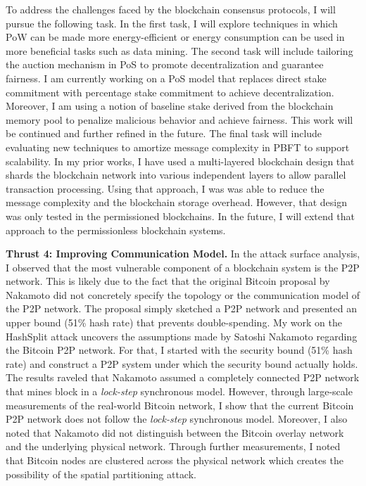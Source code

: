\documentclass{NSF}
\newcommand{\BfPara}[1]{{\noindent\textbf{#1.}}\xspace}
\begin{document}
To address the challenges faced by the blockchain consensus protocols, I will pursue the following task. In the first task, I will explore techniques in which PoW can be made more energy-efficient or energy consumption can be used in more beneficial tasks such as data mining. The second task will include tailoring the auction mechanism in PoS to promote decentralization and guarantee fairness. I am currently working on a PoS model that replaces direct stake commitment with percentage stake commitment to achieve decentralization. Moreover, I am using a notion of baseline stake derived from the blockchain memory pool to penalize malicious behavior and achieve fairness. This work will be continued and further refined in the future. The final task will include evaluating new techniques to amortize message complexity in PBFT to support scalability. In my prior works, I have used a multi-layered blockchain design that shards the blockchain network into various independent layers to allow parallel transaction processing. Using that approach, I was was able to reduce the message complexity and the blockchain storage overhead. However, that design was only tested in the permissioned blockchains. In the future, I will extend that approach to the permissionless blockchain systems. 





\BfPara{Thrust 4: Improving Communication Model} In the attack surface analysis, I observed that the most vulnerable component of a blockchain system is the P2P network. This is likely due to the fact that the original Bitcoin proposal by Nakamoto did not concretely specify the topology or the communication model of the P2P network. The proposal simply sketched a P2P network and presented an upper bound (51\% hash rate) that prevents double-spending. My work on the HashSplit attack uncovers the assumptions made by Satoshi Nakamoto regarding the Bitcoin P2P network. For that, I started with the security bound (51\% hash rate) and construct a P2P system under which the security bound actually holds. The results raveled that Nakamoto assumed a completely connected P2P network that mines block in a {\em lock-step} synchronous model. However, through large-scale measurements of the real-world Bitcoin network, I show that the current Bitcoin P2P network does not follow the {\em lock-step} synchronous model. Moreover, I also noted that Nakamoto did not distinguish between the Bitcoin overlay network and the underlying physical network. Through further measurements, I noted that Bitcoin nodes are clustered across the physical network which creates the possibility of the spatial partitioning attack. 
\end{document}
